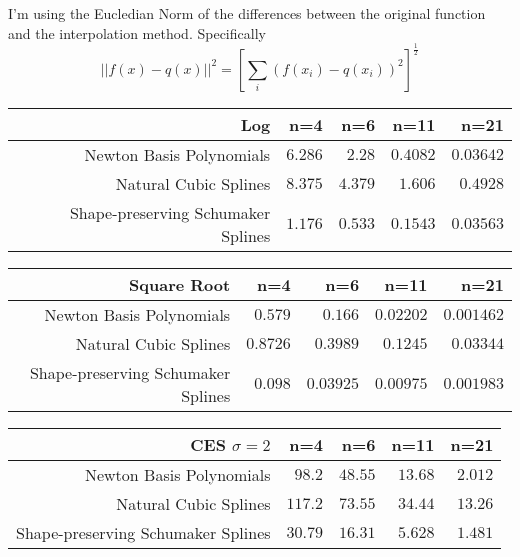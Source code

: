 \documentclass[]{article}
\begin{document}
I'm using the Eucledian Norm of the differences between the original
function and the interpolation method. Specifically
\[ || f(x)-q(x) ||^2 = \left[ \sum_i \left( f(x_i)-q(x_i) \right)^2 \right]^{\frac{1}{2}} \]

\begin{longtable}[]{@{}rrrrr@{}}
\toprule
Log & n=4 & n=6 & n=11 & n=21\tabularnewline
\midrule
\endhead
Newton Basis Polynomials & \(6.286\) & \(2.28\) & \(0.4082\) &
\(0.03642\)\tabularnewline
Natural Cubic Splines & \(8.375\) & \(4.379\) & \(1.606\) &
\(0.4928\)\tabularnewline
Shape-preserving Schumaker Splines & \(1.176\) & \(0.533\) & \(0.1543\)
& \(0.03563\)\tabularnewline
\bottomrule
\end{longtable}

\begin{longtable}[]{@{}rrrrr@{}}
\toprule
Square Root & n=4 & n=6 & n=11 & n=21\tabularnewline
\midrule
\endhead
Newton Basis Polynomials & \(0.579\) & \(0.166\) & \(0.02202\) &
\(0.001462\)\tabularnewline
Natural Cubic Splines & \(0.8726\) & \(0.3989\) & \(0.1245\) &
\(0.03344\)\tabularnewline
Shape-preserving Schumaker Splines & \(0.098\) & \(0.03925\) &
\(0.00975\) & \(0.001983\)\tabularnewline
\bottomrule
\end{longtable}

\begin{longtable}[]{@{}rrrrr@{}}
\toprule
CES \(\sigma = 2\) & n=4 & n=6 & n=11 & n=21\tabularnewline
\midrule
\endhead
Newton Basis Polynomials & \(98.2\) & \(48.55\) & \(13.68\) &
\(2.012\)\tabularnewline
Natural Cubic Splines & \(117.2\) & \(73.55\) & \(34.44\) &
\(13.26\)\tabularnewline
Shape-preserving Schumaker Splines & \(30.79\) & \(16.31\) & \(5.628\) &
\(1.481\)\tabularnewline
\bottomrule
\end{longtable}
\end{document}
